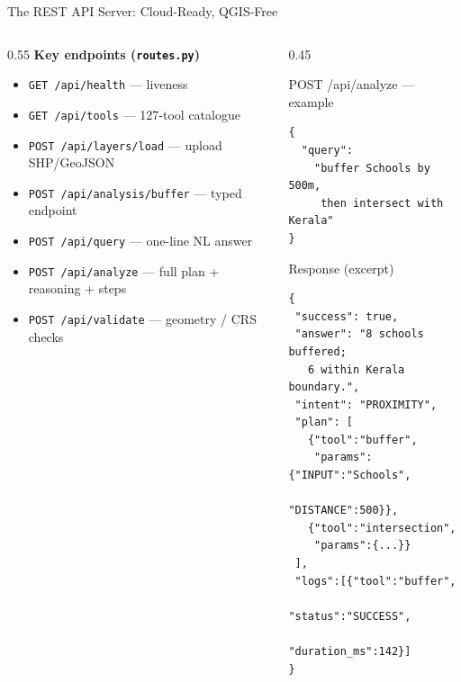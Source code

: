 \documentclass[aspectratio=169,11pt]{beamer}
\begin{document}
\begin{frame}{The REST API Server: Cloud-Ready, QGIS-Free}
\begin{columns}[T,onlytextwidth]
\begin{column}{0.55\textwidth}
      \textbf{Key endpoints (\texttt{routes.py})}
      \begin{itemize}
        \item \texttt{GET /api/health} --- liveness
        \item \texttt{GET /api/tools} --- 127-tool catalogue
        \item \texttt{POST /api/layers/load} --- upload SHP/GeoJSON
        \item \texttt{POST /api/analysis/buffer} --- typed endpoint
        \item \texttt{POST /api/query} --- one-line NL answer
        \item \texttt{POST /api/analyze} --- full plan + reasoning + steps
        \item \texttt{POST /api/validate} --- geometry / CRS checks
      \end{itemize}
    \end{column}
    \begin{column}{0.45\textwidth}
      \begin{block}{POST /api/analyze --- example}
\begin{lstlisting}
{
  "query":
    "buffer Schools by 500m,
     then intersect with Kerala"
}
\end{lstlisting}
      \end{block}
      \vspace{-0.3em}
      \begin{block}{Response (excerpt)}
\begin{lstlisting}
{
 "success": true,
 "answer": "8 schools buffered;
   6 within Kerala boundary.",
 "intent": "PROXIMITY",
 "plan": [
   {"tool":"buffer",
    "params":{"INPUT":"Schools",
              "DISTANCE":500}},
   {"tool":"intersection",
    "params":{...}}
 ],
 "logs":[{"tool":"buffer",
          "status":"SUCCESS",
          "duration_ms":142}]
}
\end{lstlisting}
      \end{block}
    \end{column}
  \end{columns}
\end{frame}
\end{document}
